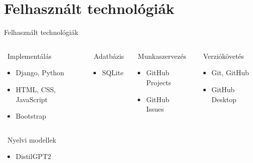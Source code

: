 \documentclass[11pt]{beamer}
\begin{document}
\section{Felhasznált technológiák}
\begin{frame}{Felhasznált technológiák}
    \vspace{-1em}
    \begin{columns}[T]
      \begin{block}{\faCode~Implementálás}
        \small
        \begin{itemize}
          \item Django, Python
          \item HTML, CSS, JavaScript
          \item Bootstrap
        \end{itemize}
      \end{block}
      \begin{block}{\faDatabase~Adatbázis}
        \small
        \begin{itemize}
          \item SQLite
        \end{itemize}
      \end{block}
      \begin{block}{\faTasks~Munkaszervezés}
        \small
        \begin{itemize}
          \item GitHub Projects
          \item GitHub Issues
        \end{itemize}
      \end{block}
      \begin{block}{\faCodeBranch~Verziókövetés}
        \small
        \begin{itemize}
          \item Git, GitHub
          \item GitHub Desktop
        \end{itemize}
      \end{block}
    \end{columns}
    \vspace{0.5em}
    \begin{columns}[T]
    \begin{block}{\faRobot~Nyelvi modellek}
        \small
        \begin{itemize}
          \item DistilGPT2

\end{itemize}
\end{block}
\end{columns}
\end{frame}
\end{document}
